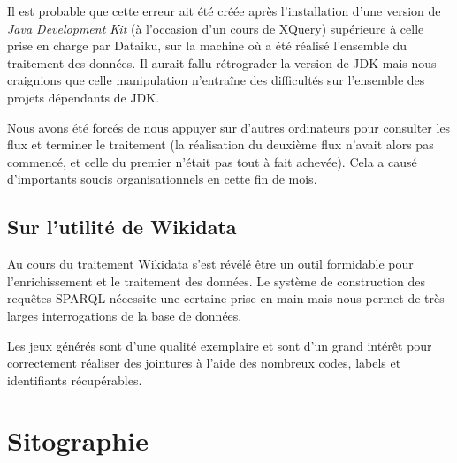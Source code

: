 \documentclass[hidelinks, 12pt]{report}
\begin{document}
Il est probable que cette erreur ait été créée après l'installation d'une version de \textit{Java Development Kit} (à l'occasion d'un cours de XQuery) supérieure à celle prise en charge par Dataiku, sur la machine où a été réalisé l'ensemble du traitement des données. Il aurait fallu rétrograder la version de JDK mais nous craignions que celle manipulation n'entraîne des difficultés sur l'ensemble des projets dépendants de JDK.

Nous avons été forcés de nous appuyer sur d'autres ordinateurs pour consulter les flux et terminer le traitement (la réalisation du deuxième flux n'avait alors pas commencé, et celle du premier n'était pas tout à fait achevée). Cela a causé d'importants soucis organisationnels en cette fin de mois.

\section{Sur l'utilité de Wikidata}

Au cours du traitement Wikidata s'est révélé être un outil formidable pour l'enrichissement et le traitement des données. Le système de construction des requêtes SPARQL nécessite une certaine prise en main mais nous permet de très larges interrogations de la base de données.

Les jeux générés sont d'une qualité exemplaire et sont d'un grand intérêt pour correctement réaliser des jointures à l'aide des nombreux codes, labels et identifiants récupérables.
\newpage





%





\chapter{Sitographie}
\printbibliography[heading=none]
\newpage



\end{document}
